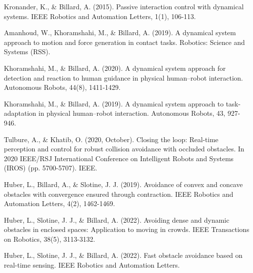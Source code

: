\begin{thebibliography}{00}
 Kronander, K., \& Billard, A. (2015). Passive interaction control with dynamical systems. IEEE Robotics and Automation Letters, 1(1), 106-113.

 Amanhoud, W., Khoramshahi, M., \& Billard, A. (2019). A dynamical system approach to motion and force generation in contact tasks. Robotics: Science and Systems (RSS).

 Khoramshahi, M., \& Billard, A. (2020). A dynamical system approach for detection and reaction to human guidance in physical human–robot interaction. Autonomous Robots, 44(8), 1411-1429.

 Khoramshahi, M., \& Billard, A. (2019). A dynamical system approach to task-adaptation in physical human–robot interaction. Autonomous Robots, 43, 927-946.

 Tulbure, A., \& Khatib, O. (2020, October). Closing the loop: Real-time perception and control for robust collision avoidance with occluded obstacles. In 2020 IEEE/RSJ International Conference on Intelligent Robots and Systems (IROS) (pp. 5700-5707). IEEE.

 Huber, L., Billard, A., \& Slotine, J. J. (2019). Avoidance of convex and concave obstacles with convergence ensured through contraction. IEEE Robotics and Automation Letters, 4(2), 1462-1469.

 Huber, L., Slotine, J. J., \& Billard, A. (2022). Avoiding dense and dynamic obstacles in enclosed spaces: Application to moving in crowds. IEEE Transactions on Robotics, 38(5), 3113-3132.

 Huber, L., Slotine, J. J., \& Billard, A. (2022). Fast obstacle avoidance based on real-time sensing. IEEE Robotics and Automation Letters.

\end{thebibliography}
